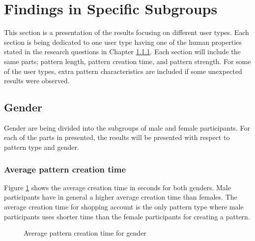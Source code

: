 \section{Findings in Specific Subgroups}

  This section is a presentation of the results focusing on different user types. Each section is being dedicated to one user type having one of the human properties stated in the research questions in Chapter \ref{}. Each section will include the same parts; pattern length, pattern creation time, and pattern strength. For some of the user types, extra pattern characteristics are included if some unexpected results were observed. 

	\subsection{Gender}
    Gender are being divided into the subgroups of male and female participants. For each of the parts in presented, the results will be presented with respect to pattern type and gender. 

    \subsubsection{Average pattern creation time}
    Figure \ref{fig:avgcreationtimegender} shows the average creation time in seconds for both genders. Male participants have in general a higher average creation time than females. The average creation time for shopping account is the only pattern type where male participants uses shorter time than the female participants for creating a pattern.

    \begin{figure}[H]
      \centering
      \caption{Average pattern creation time for gender}
      \label{fig:avgcreationtimegender}
    \end{figure}

